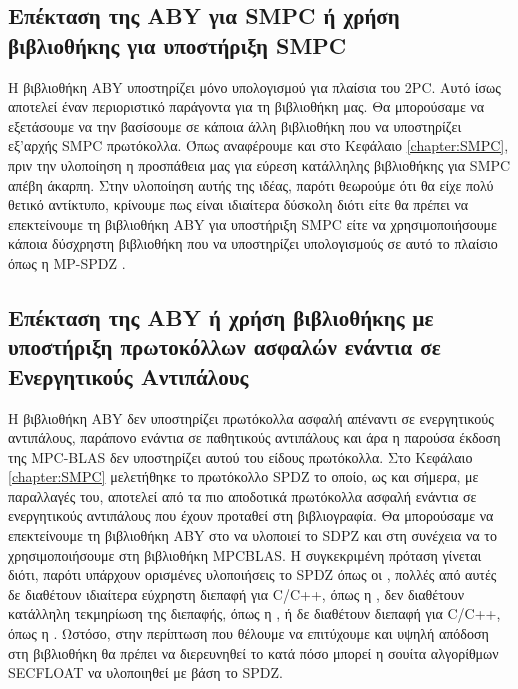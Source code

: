 \subsection{Επέκταση της ABY για SMPC ή χρήση βιβλιοθήκης για υποστήριξη SMPC}
Η βιβλιοθήκη ABY υποστηρίζει μόνο υπολογισμού για πλαίσια του 2PC. Αυτό ίσως αποτελεί έναν περιοριστικό παράγοντα για τη βιβλιοθήκη μας. Θα μπορούσαμε να εξετάσουμε να την βασίσουμε σε κάποια άλλη βιβλιοθήκη που να υποστηρίζει εξ'αρχής SMPC πρωτόκολλα. Όπως αναφέρουμε και στο Κεφάλαιο \ref{chapter:SMPC}, πριν την υλοποίηση η προσπάθεια μας για εύρεση κατάλληλης βιβλιοθήκης για SMPC απέβη άκαρπη. Στην υλοποίηση αυτής της ιδέας, παρότι θεωρούμε ότι θα είχε πολύ θετικό αντίκτυπο, κρίνουμε πως είναι ιδιαίτερα δύσκολη διότι είτε θα πρέπει να επεκτείνουμε τη βιβλιοθήκη ABY για υποστήριξη SMPC είτε να χρησιμοποιήσουμε κάποια δύσχρηστη βιβλιοθήκη που να υποστηρίζει υπολογισμούς σε αυτό το πλαίσιο όπως η MP-SPDZ \cite{mp-spdz}.

\subsection{Επέκταση της ABY ή χρήση βιβλιοθήκης με υποστήριξη πρωτοκόλλων ασφαλών ενάντια σε Ενεργητικούς Αντιπάλους}
Η βιβλιοθήκη ABY δεν υποστηρίζει πρωτόκολλα ασφαλή απέναντι σε ενεργητικούς αντιπάλους, παράπονο ενάντια σε παθητικούς αντιπάλους και άρα η παρούσα έκδοση της MPC-BLAS δεν υποστηρίζει αυτού του είδους πρωτόκολλα. Στο Κεφάλαιο \ref{chapter:SMPC} μελετήθηκε το πρωτόκολλο SPDZ το οποίο, ως και σήμερα, με παραλλαγές του, αποτελεί από τα πιο αποδοτικά πρωτόκολλα ασφαλή ενάντια σε ενεργητικούς αντιπάλους που έχουν προταθεί στη βιβλιογραφία. Θα μπορούσαμε να επεκτείνουμε τη βιβλιοθήκη ABY στο να υλοποιεί το SDPZ και στη συνέχεια να το χρησιμοποιήσουμε στη βιβλιοθήκη MPCBLAS. Η συγκεκριμένη πρόταση γίνεται διότι, παρότι υπάρχουν ορισμένες υλοποιήσεις το SPDZ όπως οι \cite{mp-spdz,aly2021scale,FRESCO}  , πολλές από αυτές δε διαθέτουν ιδιαίτερα εύχρηστη διεπαφή για C/C++, όπως η \cite{aly2021scale}, δεν διαθέτουν κατάλληλη τεκμηρίωση της διεπαφής, όπως η \cite{mp-spdz}, ή δε διαθέτουν διεπαφή για C/C++, όπως η \cite{FRESCO}. Ωστόσο, στην περίπτωση που θέλουμε να επιτύχουμε και υψηλή απόδοση στη βιβλιοθήκη θα πρέπει να διερευνηθεί το κατά πόσο μπορεί η σουίτα αλγορίθμων SECFLOAT να υλοποιηθεί με βάση το SPDZ.
